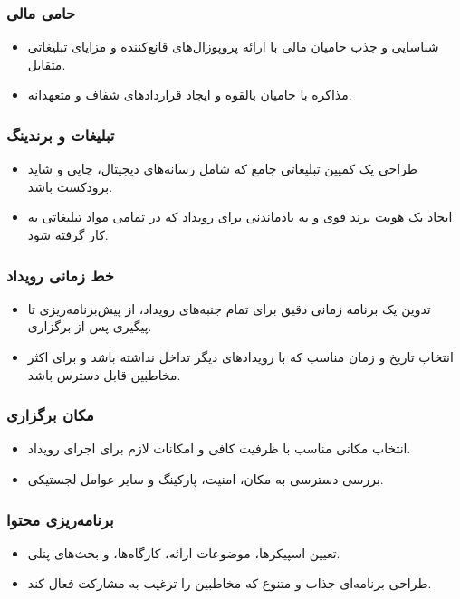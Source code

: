 \subsubsection*{حامی مالی}
\begin{itemize}
	\item شناسایی و جذب حامیان مالی با ارائه پروپوزال‌های قانع‌کننده و مزایای تبلیغاتی متقابل.
	\item مذاکره با حامیان بالقوه و ایجاد قراردادهای شفاف و متعهدانه.
\end{itemize}

\subsubsection*{تبلیغات و برندینگ}
\begin{itemize}
	\item طراحی یک کمپین تبلیغاتی جامع که شامل رسانه‌های دیجیتال، چاپی و شاید برودکست باشد.
	\item ایجاد یک هویت برند قوی و به یادماندنی برای رویداد که در تمامی مواد تبلیغاتی به کار گرفته شود.
\end{itemize}

\subsubsection*{خط زمانی رویداد}
\begin{itemize}
	\item تدوین یک برنامه زمانی دقیق برای تمام جنبه‌های رویداد، از پیش‌برنامه‌ریزی تا پیگیری پس از برگزاری.
	\item انتخاب تاریخ و زمان مناسب که با رویدادهای دیگر تداخل نداشته باشد و برای اکثر مخاطبین قابل دسترس باشد.
\end{itemize}

\subsubsection*{مکان برگزاری}
\begin{itemize}
	\item انتخاب مکانی مناسب با ظرفیت کافی و امکانات لازم برای اجرای رویداد.
	\item بررسی دسترسی به مکان، امنیت، پارکینگ و سایر عوامل لجستیکی.
\end{itemize}

\subsubsection*{برنامه‌ریزی محتوا}
\begin{itemize}
	\item تعیین اسپیکرها، موضوعات ارائه، کارگاه‌ها، و بحث‌های پنلی.
	\item طراحی برنامه‌ای جذاب و متنوع که مخاطبین را ترغیب به مشارکت فعال کند.
\end{itemize}

